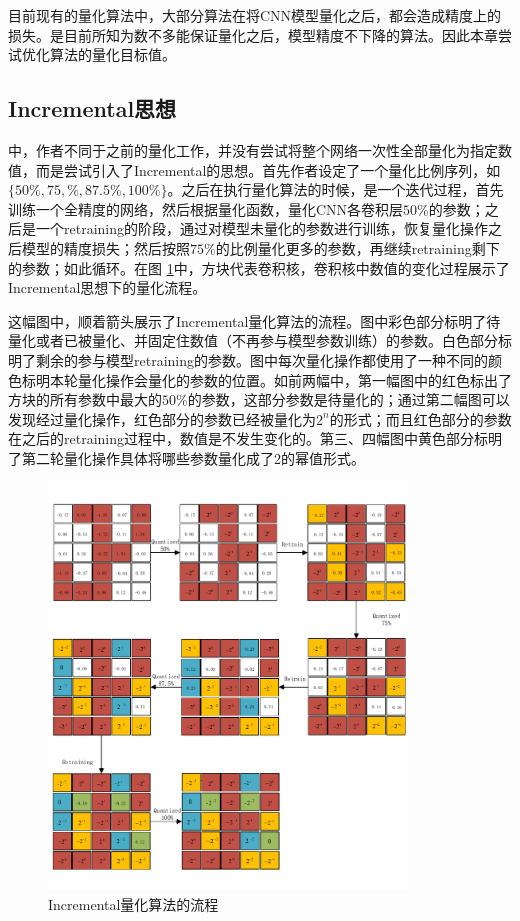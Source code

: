 \documentclass[ pdftex, oneside, master]{NJUthesis}
\begin{document}
目前现有的量化算法中，大部分算法在将CNN模型量化之后，都会造成精度上的损失。\cite{incremental}是目前所知为数不多能保证量化之后，模型精度不下降的算法。因此本章尝试优化\cite{incremental}算法的量化目标值。

\subsection{Incremental思想}

\cite{incremental}中，作者不同于之前的量化工作，并没有尝试将整个网络一次性全部量化为指定数值，而是尝试引入了Incremental的思想。首先作者设定了一个量化比例序列，如$\{50\%, 75,\%, 87.5\%, 100\%\}$。之后在执行量化算法的时候，是一个迭代过程，首先训练一个全精度的网络，然后根据量化函数，量化CNN各卷积层$50\%$的参数；之后是一个retraining的阶段，通过对模型未量化的参数进行训练，恢复量化操作之后模型的精度损失；然后按照$75\%$的比例量化更多的参数，再继续retraining剩下的参数；如此循环。在图 \ref{incremental}中，方块代表卷积核，卷积核中数值的变化过程展示了Incremental思想下的量化流程。

这幅图中，顺着箭头展示了Incremental量化算法的流程。图中彩色部分标明了待量化或者已被量化、并固定住数值（不再参与模型参数训练）的参数。白色部分标明了剩余的参与模型retraining的参数。图中每次量化操作都使用了一种不同的颜色标明本轮量化操作会量化的参数的位置。如前两幅中，第一幅图中的红色标出了方块的所有参数中最大的$50\%$的参数，这部分参数是待量化的；通过第二幅图可以发现经过量化操作，红色部分的参数已经被量化为$2^n$的形式；而且红色部分的参数在之后的retraining过程中，数值是不发生变化的。第三、四幅图中黄色部分标明了第二轮量化操作具体将哪些参数量化成了2的幂值形式。

\begin{figure}
\centering
\includegraphics[width=0.85\textwidth]{incremental.pdf}
\caption{Incremental量化算法的流程}
\label{incremental}
\end{figure}
\end{document}
